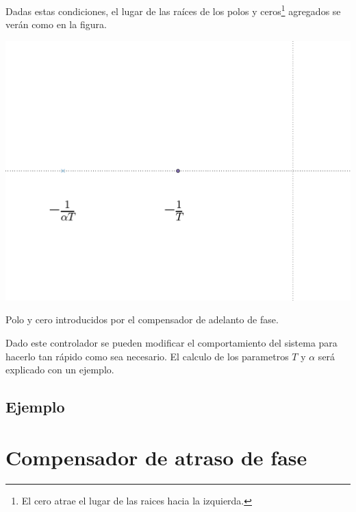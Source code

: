         Dadas estas condiciones, el lugar de las raíces de los polos y ceros\footnote{El cero atrae el lugar de las raices hacia la izquierda.} agregados se verán como en la figura.

        \begin{marginfigure}
            \centering
            \includegraphics[width=\textwidth]{./imagenes/adelantopoloycero.pdf}
            \caption{\label{fig:adelantopoloycero}Polo y cero introducidos por el compensador de adelanto de fase.}
        \end{marginfigure}

        Dado este controlador se pueden modificar el comportamiento del sistema para hacerlo tan rápido como sea necesario. El calculo de los parametros $T$ y $\alpha$ será explicado con un ejemplo.


        \subsection{Ejemplo}


    \newpage
    \section{Compensador de atraso de fase}

